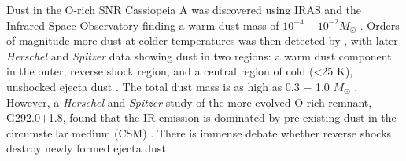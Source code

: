 \documentclass[fleqn,usenatbib]{mnras}
\begin{document}
Dust in the O-rich SNR Cassiopeia A was discovered using IRAS and the Infrared Space Observatory finding a warm dust mass of $10^{-4} - 10^{-2} M_\odot$ \citep[e.g.][]{Braun1987, Dwek1987, Arendt1999, Douvion2001}. Orders of magnitude more  dust at colder temperatures was then detected by \cite{Dunne2003,Dunne2009}, with later \textit{Herschel} and  \textit{Spitzer}  data showing dust in two regions: a warm dust component in the outer, reverse shock region, and a central region of cold (\textless 25 K), unshocked ejecta dust \citep{Barlow2010}.  The total dust mass is as high as 0.3 $-$ 1.0 $M_\odot$ \citep{Dunne2003,Rho2008,Barlow2010,DeLooze2017}. However, a \textit{Herschel} and \textit{Spitzer} study of the more evolved O-rich remnant, G292.0$+$1.8, found that the IR emission is dominated by pre-existing dust in the circumstellar medium (CSM) \citep{Ghavamian2016}. There is immense debate whether reverse shocks destroy newly formed ejecta dust \citep[e.g.][]{Lau2015, Micelotta2016, Biscaro2016}
\end{document}
